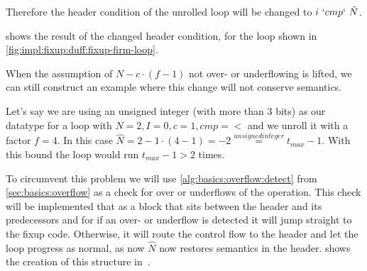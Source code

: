 Therefore the header condition of the unrolled loop will be changed to $i~`cmp`~\hat{N}$.

 shows the result of the changed header condition, for the loop shown in \cref{fig:impl:fixup:duff:fixup-firm-loop}.



When the assumption of $N - c \cdot (f - 1)$ not over- or underflowing is lifted, we can still construct an example where this change will not conserve semantics.

Let's say we are using an unsigned integer (with more than 3 bits) as our datatype for a loop with $N = 2, I = 0, c = 1, cmp = <$ and we unroll it with a factor $f = 4$.
In this case $\hat{N} = 2 - 1 \cdot (4 - 1) = -2 \overset{unsigned integer}{=} t_{max} - 1$.
With this bound the loop would run $t_{max} - 1 > 2$ times.

To circumvent this problem we will use \cref{alg:basics:overflow:detect} from \cref{sec:basics:overflow} as a check for over or underflows of the operation.
This check will be implemented that as a block that sits between the header and its predecessors and for if an over- or underflow is detected it will jump straight to the fixup code.
Otherwise, it will route the control flow to the header and let the loop progress as normal, as now $\hat{N}$ now restores semantics in the header.
 shows the creation of this structure in~\libFIRM.


